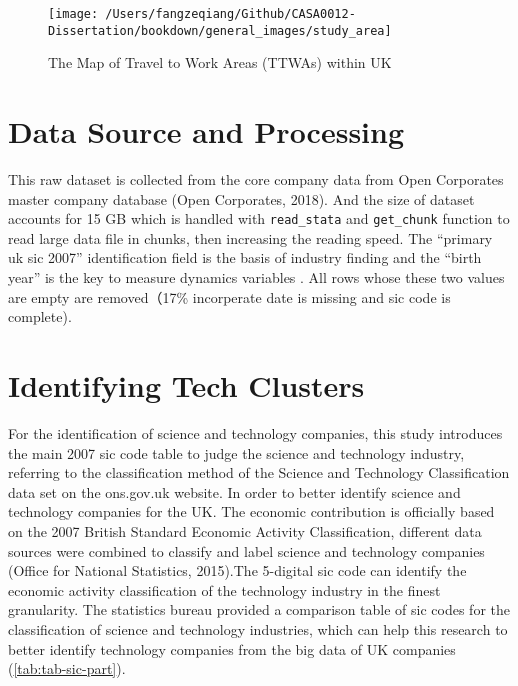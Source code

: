 \documentclass[
  12pt,
  oneside]{book}
\begin{document}
\begin{figure}
\texttt{[image: /Users/fangzeqiang/Github/CASA0012-Dissertation/bookdown/general\_images/study\_area]} \caption{The Map of Travel to Work Areas (TTWAs) within UK}\label{fig:fig-study-area}
\end{figure}

\hypertarget{data-source-and-processing}{%
\section{Data Source and Processing}\label{data-source-and-processing}}

This raw dataset is collected from the core company data from Open Corporates master company database (Open Corporates, 2018). And the size of dataset accounts for 15 GB which is handled with \texttt{read\_stata} and \texttt{get\_chunk} function to read large data file in chunks, then increasing the reading speed. The ``primary uk sic 2007'' identification field is the basis of industry finding and the ``birth year'' is the key to measure dynamics variables . All rows whose these two values are empty are removed（17\% incorperate date is missing and sic code is complete).

\hypertarget{identifying-tech-clusters}{%
\section{Identifying Tech Clusters}\label{identifying-tech-clusters}}

For the identification of science and technology companies, this study introduces the main 2007 sic code table to judge the science and technology industry, referring to the classification method of the Science and Technology Classification data set on the ons.gov.uk website. In order to better identify science and technology companies for the UK. The economic contribution is officially based on the 2007 British Standard Economic Activity Classification, different data sources were combined to classify and label science and technology companies (Office for National Statistics, 2015).The 5-digital sic code can identify the economic activity classification of the technology industry in the finest granularity. The statistics bureau provided a comparison table of sic codes for the classification of science and technology industries, which can help this research to better identify technology companies from the big data of UK companies (\ref{tab:tab-sic-part}).
\end{document}
